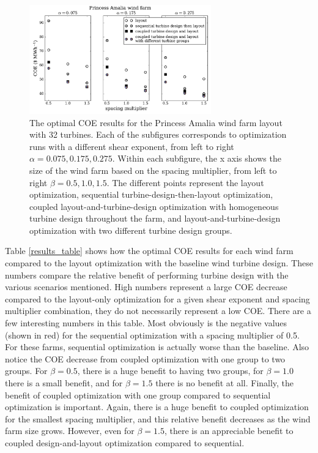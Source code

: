 \begin{figure}[htbp]
  \centering
  \includegraphics[width=0.7\textwidth]{Figures/amalia_results1.pdf}
  \caption{\label{amalia_results} The optimal COE results for the Princess Amalia wind farm layout with 32 turbines. Each of the subfigures corresponds to optimization runs with a different shear exponent, from left to right $\alpha=0.075,0.175,0.275$. Within each subfigure, the x axis shows the size of the wind farm based on the spacing multiplier, from left to right $\beta=0.5,1.0,1.5$. The different points represent the layout optimization, sequential turbine-design-then-layout optimization, coupled layout-and-turbine-design optimization with homogeneous turbine design throughout the farm, and layout-and-turbine-design optimization with two different turbine design groups.}
\end{figure}



Table \ref{results_table} shows how the optimal COE results for each wind farm compared to the layout optimization with the baseline wind turbine design. These numbers compare the relative benefit of performing turbine design with the various scenarios mentioned. High numbers represent a large COE decrease compared to the layout-only optimization for a given shear exponent and spacing multiplier combination, they do not necessarily represent a low COE.
There are a few interesting numbers in this table. Most obviously is the negative values (shown in red) for the sequential optimization with a spacing multiplier of 0.5. For these farms, sequential optimization is actually worse than the baseline. Also notice the COE decrease from coupled optimization with one group to two groups. For $\beta=0.5$, there is a huge benefit to having two groups, for $\beta=1.0$ there is a small benefit, and for $\beta=1.5$ there is no benefit at all. Finally, the benefit of coupled optimization with one group compared to sequential optimization is important. Again, there is a huge benefit to coupled optimization for the smallest spacing multiplier, and this relative benefit decreases as the wind farm size grows. However, even for $\beta=1.5$, there is an appreciable benefit to coupled design-and-layout optimization compared to sequential.




